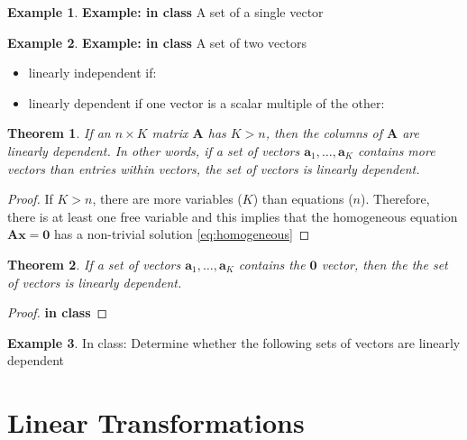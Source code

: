 \documentclass[
]{book}
\newtheorem{theorem}{Theorem}[chapter]
\theoremstyle{definition}
\theoremstyle{definition}
\newtheorem{example}{Example}[chapter]
\theoremstyle{definition}
\theoremstyle{definition}
\theoremstyle{remark}
\begin{document}
\begin{example}
\textbf{Example: in class} A set of a single vector
\end{example}

\begin{example}

\textbf{Example: in class} A set of two vectors

\begin{itemize}
\item
  linearly independent if:
\item
  linearly dependent if one vector is a scalar multiple of the other:
\end{itemize}

\end{example}

\begin{theorem}
If an \(n \times K\) matrix \(\mathbf{A}\) has \(K > n\), then the columns of \(\mathbf{A}\) are linearly dependent. In other words, if a set of vectors \(\mathbf{a}_1, \ldots, \mathbf{a}_K\) contains more vectors than entries within vectors, the set of vectors is linearly dependent.
\end{theorem}

\begin{proof}
If \(K>n\), there are more variables (\(K\)) than equations (\(n\)). Therefore, there is at least one free variable and this implies that the homogeneous equation \(\mathbf{A}\mathbf{x}=\mathbf{0}\) has a non-trivial solution \eqref{eq:homogeneous}
\end{proof}

\begin{theorem}
If a set of vectors \(\mathbf{a}_1, \ldots, \mathbf{a}_K\) contains the \(\mathbf{0}\) vector, then the the set of vectors is linearly dependent.
\end{theorem}

\begin{proof}
\textbf{in class}
\end{proof}

\begin{example}
In class: Determine whether the following sets of vectors are linearly dependent
\end{example}

\hypertarget{linear-transformations}{%
\chapter{Linear Transformations}\label{linear-transformations}}
\end{document}

